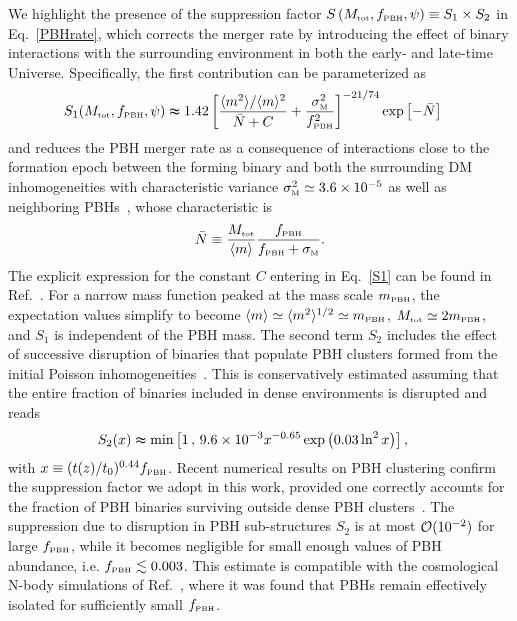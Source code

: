 \documentclass[11pt,a4paper]{article}
\newcommand{\lp }{\left (}
\newcommand{\llp }{\left [}
\newcommand{\rp }{\right )}
\newcommand{\rrp }{\right ]}
\newcommand{\PBH}{\text{\tiny PBH}}
\begin{document}
We highlight the presence of the suppression factor $S\lp M_\text{\tiny tot}, f_\PBH,\psi  \rp \equiv S_1 \times S_2$
in Eq.~\eqref{PBHrate}, which corrects  the merger rate by 
introducing the effect of binary interactions with the surrounding environment in both the early- and late-time Universe. 
Specifically, the first contribution can be parameterized as~\cite{Hutsi:2020sol}
\begin{align}
	S_1 (M_\text{\tiny tot}, f_\PBH, \psi)& \thickapprox 1.42 \llp \frac{\langle m^2 \rangle/\langle m\rangle^2}{\bar N +C} + \frac{\sigma ^2_\text{\tiny M}}{f^2_\PBH}\rrp ^{-21/74} \exp \llp -  \bar N \rrp 
		\label{S1}
\end{align}
and reduces the PBH merger rate 
as a consequence of interactions close to the formation epoch between the forming binary and both the surrounding DM inhomogeneities with characteristic variance $\sigma_\text{\tiny M}^2 \simeq 3.6 \times 10^{-5}$
 as well as neighboring PBHs~\cite{Ali-Haimoud:2017rtz,Raidal:2018bbj,Liu:2018ess}, whose characteristic is
 \begin{equation}
\bar N \equiv \frac{M_\text{\tiny tot}}{\langle m \rangle } \frac{f_\PBH}{f_\PBH+ \sigma_\text{\tiny M}}.
\end{equation}
The explicit expression for the constant $C$ entering in Eq.~\eqref{S1} can be found in Ref.~\cite{Hutsi:2020sol}.
For a narrow mass function peaked at the mass scale $m_\PBH$, the expectation values simplify to become $\langle m \rangle \simeq  \langle m^2 \rangle^{1/2} \simeq  m_\PBH$, $M_\text{\tiny tot} \simeq 2 m_\PBH$, and $S_1$ is independent of the PBH mass. 
The second term $S_2$ includes the effect of successive disruption of binaries that populate PBH clusters formed from the initial Poisson inhomogeneities~\cite{Vaskonen:2019jpv,Jedamzik:2020ypm,Young:2020scc,Jedamzik:2020omx,DeLuca:2020jug,Trashorras:2020mwn,Tkachev:2020uin,Hutsi:2020sol}.
This is conservatively estimated assuming that the entire fraction of binaries included in dense environments is disrupted and reads \cite{Hutsi:2020sol}
\begin{align}\label{eq:supS2}
	S_2 (x) & \thickapprox 
	\text{min} 
	\llp 1\, ,\, 9.6 \times 10^{-3} x ^{-0.65} \exp \lp 0.03 \ln^2 x \rp  \rrp ,
\end{align}
with $x \equiv (t(z)/t_0)^{0.44} f_\PBH$. 
Recent numerical results on PBH clustering confirm the suppression factor we adopt in this work, 
provided one correctly accounts for the fraction of PBH binaries surviving outside dense PBH clusters~\cite{link}.
The suppression due to disruption in PBH sub-structures $S_2$ is at most ${\cal O}(10^{-2})$ for large $f_\PBH$, 
while it becomes negligible for small enough values of PBH abundance, i.e. $f_\PBH \lesssim 0.003$.
This estimate is compatible with the cosmological N-body simulations of Ref.~\cite{Inman:2019wvr}, where it was found that PBHs remain effectively isolated for sufficiently small $f_\PBH$.
\end{document}
